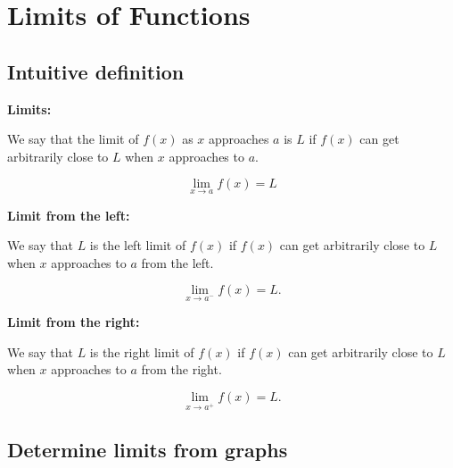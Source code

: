
\hypertarget{limits-of-functions}{%
\section{Limits of Functions}\label{limits-of-functions}}

\hypertarget{intuitive-definition}{%
\subsection{Intuitive definition}\label{intuitive-definition}}

\noindent\textbf{Limits:}

We say that the limit of \(f(x)\) as \(x\) approaches \(a\) is \(L\) if $f(x)$ can get arbitrarily close to $L$ when \(x\) approaches to \(a\). 

\[\lim\limits_{x \to a} f(x)=L\]

\noindent\textbf{Limit from the left:}

We say that \(L\) is the left limit of \(f(x)\) if $f(x)$ can get arbitrarily close to $L$ when \(x\) approaches to \(a\) from the left.

\[\lim\limits_{x \to a^{-} }f(x)=L.\]

\textbf{Limit from the right:}

We say that \(L\) is the right limit of \(f(x)\) if $f(x)$ can get arbitrarily close to $L$ when \(x\) approaches to \(a\) from the right.

\[\lim\limits_{x \to a^+}f(x)=L.\]

\hypertarget{determine-limits-from-graphs}{%
\subsection{Determine limits from
graphs}\label{determine-limits-from-graphs}}

